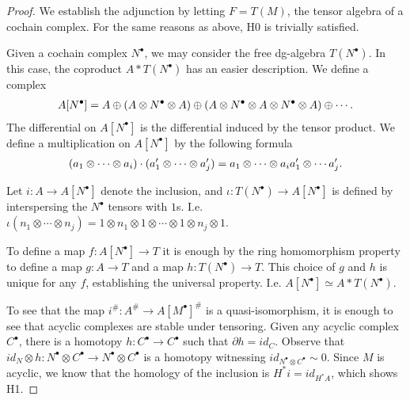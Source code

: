 \documentclass[../thesis.tex]{subfiles}
\begin{document}
            \begin{proof}
                We establish the adjunction by letting $F = T(M)$, the tensor algebra of a cochain complex. For the same reasons as above, H0 is trivially satisfied. 

                Given a cochain complex $N^\bullet$, we may consider the free dg-algebra $T(N^\bullet)$. In this case, the coproduct $A\ast T(N^\bullet)$ has an easier description. We define a complex
                \begin{align*}
                    A[N^\bullet] = A \oplus (A \otimes N^\bullet \otimes A) \oplus (A \otimes N^\bullet \otimes A \otimes N^\bullet \otimes A) \oplus \cdots\tt{.}
                \end{align*}
                The differential on $A[N^\bullet]$ is the differential induced by the tensor product. We define a multiplication on $A[N^\bullet]$ by the following formula
                \begin{align*}
                    (a_1\otimes\cdots\otimes a_i)\cdot(a_1'\otimes\cdots\otimes a_j') = a_1\otimes\cdots\otimes a_ia_1'\otimes\cdots a_j'\tt{.}
                \end{align*}

                Let $i : A \rightarrow A[N^\bullet]$ denote the inclusion, and $\iota : T(N^\bullet) \rightarrow A[N^\bullet]$ is defined by interspersing the $N^\bullet$ tensors with $1$s. I.e. $\iota(n_1\otimes\cdots\otimes n_j) = 1 \otimes n_1 \otimes 1 \otimes \cdots \otimes 1 \otimes n_j \otimes 1$.

                To define a map $f: A[N^\bullet] \rightarrow T$ it is enough by the ring homomorphism property to define a map $g: A \rightarrow T$ and a map $h: T(N^\bullet) \rightarrow T$. This choice of $g$ and $h$ is unique for any $f$, establishing the universal property. I.e. $A[N^\bullet] \simeq A\ast T(N^\bullet)$.
                
                To see that the map $i^\#: A^\# \rightarrow A[M^\bullet]^\#$ is a quasi-isomorphism, it is enough to see that acyclic complexes are stable under tensoring. Given any acyclic complex $C^\bullet$, there is a homotopy $h: C^\bullet \rightarrow C^\bullet$ such that $\partial h = id_C$. Observe that $id_N\otimes h : N^\bullet\otimes C^\bullet \rightarrow N^\bullet\otimes C^\bullet$ is a homotopy witnessing $id_{N^\bullet\otimes C^\bullet} \sim 0$. Since $M$ is acyclic, we know that the homology of the inclusion is $H^*i = id_{H^*A}$, which shows H1.
            \end{proof}
\end{document}
